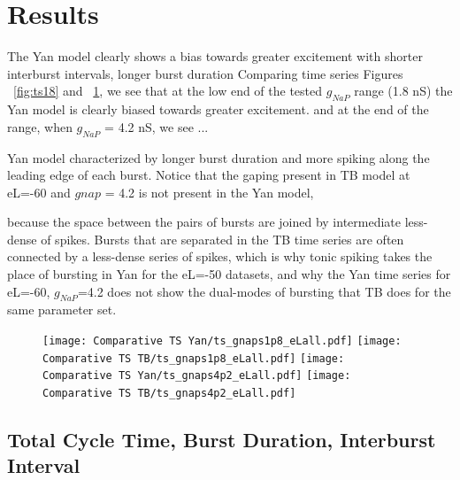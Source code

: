 \documentclass[11pt]{article}
\begin{document}
\oddsidemargin -0.22in
\evensidemargin -0.22in
\topmargin 0.05in
\topskip 0.25in
\headheight 0.05in
\headsep 0.25in

\graphicspath{{"../Data and Analysis/long TB Yan/plots/"}{"../Data and Analysis/short TB Yan/plots/"}}

\FloatBarrier
\section{Results}
The Yan model clearly shows a bias towards greater excitement with shorter interburst intervals, longer burst duration
Comparing time series Figures ~\ref{fig:ts18} and ~\ref{fig:ts42}, we see that at the low end of the tested $g_{NaP}$ range (1.8 nS) the Yan model is clearly biased towards greater excitement.
and at the end of the range, when $g_{NaP}$ = 4.2 nS, we see ...

Yan model characterized by longer burst duration and more spiking along the leading edge of each burst. Notice that the gaping present in TB model at eL=-60 and $gnap$ = 4.2 is not present in the Yan model, 

because the space between the pairs of bursts are joined by intermediate less-dense of spikes.
Bursts that are separated in the TB time series are often connected by a less-dense series of spikes, which is why tonic spiking takes the place of bursting in Yan for the eL=-50 datasets, and why the Yan time series for eL=-60, $g_{NaP}$=4.2 does not show the dual-modes of bursting that TB does for the same parameter set.



\begin{figure}[h]
	\centering
	\texttt{[image: Comparative TS Yan/ts\_gnaps1p8\_eLall.pdf]}
	\texttt{[image: Comparative TS TB/ts\_gnaps1p8\_eLall.pdf]}
	\texttt{[image: Comparative TS Yan/ts\_gnaps4p2\_eLall.pdf]}
	\texttt{[image: Comparative TS TB/ts\_gnaps4p2\_eLall.pdf]}
	\label{fig:ts42}
\end{figure}

\subsection{Total Cycle Time, Burst Duration, Interburst Interval}
\end{document}
